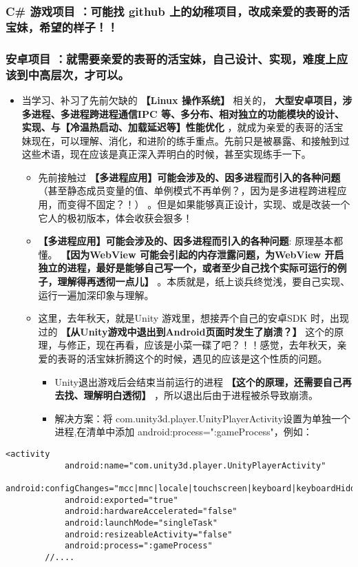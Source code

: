 \documentclass[9pt, b5paper]{article}
\begin{document}
\subsubsection{\textbf{C\# 游戏项目} ：可能找 github 上的幼稚项目，改成亲爱的表哥的活宝妹，希望的样子！！}
\label{sec-1-3-1}
\subsubsection{\textbf{安卓项目} ：就需要亲爱的表哥的活宝妹，自己设计、实现，难度上应该到中高层次，才可以。}
\label{sec-1-3-2}
\begin{itemize}
\item 当学习、补习了先前欠缺的 \textbf{【Linux 操作系统】} 相关的， \textbf{大型安卓项目，涉多进程、多进程跨进程通信IPC 等、多分布、相对独立的功能模块的设计、实现、与【冷温热启动、加载延迟等】性能优化} ，就成为亲爱的表哥的活宝妹现在，可以理解、消化，和进阶的练手重点。先前只是被暴露、和接触到过这些术语，现在应该是真正深入弄明白的时候，甚至实现练手一下。
\begin{itemize}
\item 先前接触过 \textbf{【多进程应用】可能会涉及的、因多进程而引入的各种问题} （甚至静态成员变量的值、单例模式不再单例？，因为是多进程跨进程应用，而变得不固定？！） 。但是如果能够真正设计，实现、或是改装一个它人的极初版本，体会收获会狠多！
\item \textbf{【多进程应用】可能会涉及的、因多进程而引入的各种问题}: 原理基本都懂。 \textbf{【因为WebView 可能会引起的内存泄露问题，为WebView 开启独立的进程，最好是能够自己写一个，或者至少自己找个实际可运行的例子，理解得再透彻一点儿】} 。本质就是，纸上谈兵终觉浅，要自己实现、运行一遍加深印象与理解。
\item 这里，去年秋天，就是Unity 游戏里，想接弄个自己的安卓SDK 时，出现过的 \textbf{【从Unity游戏中退出到Android页面时发生了崩溃？】} 这个的原理，与修正，现在再看，应该是小菜一碟了吧？！！感觉，去年秋天，亲爱的表哥的活宝妹折腾这个的时候，遇见的应该是这个性质的问题。
\begin{itemize}
\item Unity退出游戏后会结束当前运行的进程 \textbf{【这个的原理，还需要自己再去找、理解明白透彻】} ，所以退出后由于进程被杀导致崩溃。
\item 解决方案：将 com.unity3d.player.UnityPlayerActivity设置为单独一个进程,在清单中添加 android:process=":gameProcess"，例如：
\end{itemize}
\end{itemize}
\end{itemize}
\begin{verbatim}
<activity
            android:name="com.unity3d.player.UnityPlayerActivity"
            android:configChanges="mcc|mnc|locale|touchscreen|keyboard|keyboardHidden|navigation|orientation|screenLayout|uiMode|screenSize|smallestScreenSize|fontScale|layoutDirection|density"
            android:exported="true"
            android:hardwareAccelerated="false"
            android:launchMode="singleTask"
            android:resizeableActivity="false"
            android:process=":gameProcess"
	    //....
\end{verbatim}
\end{document}

